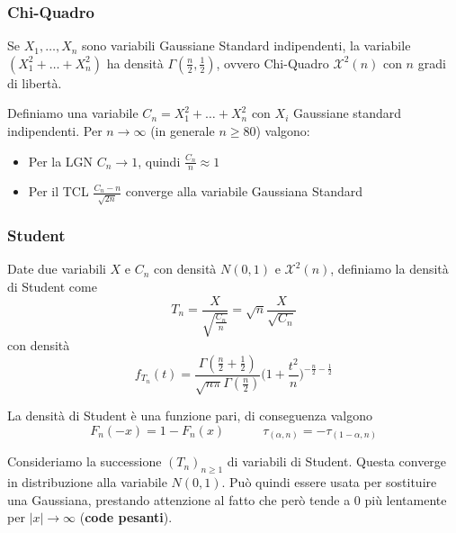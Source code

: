 \subsubsection{Chi-Quadro}
\begin{definition}
	Se $X_1, \ldots, X_n$ sono variabili Gaussiane Standard indipendenti, la variabile $(X_1^2 + \ldots + X_n^2)$ ha densità $\Gamma(\frac{n}{2}, \frac{1}{2})$, ovvero Chi-Quadro $\mathcal{X}^2(n)$ con $n$ gradi di libertà.
\end{definition}

\begin{proposition}[Approssimazioni]
	Definiamo una variabile $C_n = X_1^2 + \ldots + X_n^2$ con $X_i$ Gaussiane standard indipendenti. Per $n\to \infty$ (in generale $n \geq 80$) valgono:
	\begin{itemize}
		\item Per la LGN $C_n \to 1$, quindi $\frac{C_n}{n} \approx 1$
		\item Per il TCL $\frac{C_n -n}{\sqrt{2n}}$ converge alla variabile Gaussiana Standard
	\end{itemize}
\end{proposition}
\subsubsection{Student}
\begin{definition}
	Date due variabili $X$ e $C_n$ con densità $N(0,1)$ e $\mathcal{X}^2(n)$, definiamo la densità di Student come
	\begin{equation}
		T_n = \frac{X}{\sqrt{\frac{C_n}{n}}} = \sqrt{n} \frac{X}{\sqrt{C_n}}
	\end{equation}
	con densità
	\begin{equation}
		f_{T_n}(t) = \frac{\Gamma(\frac{n}{2}+\frac{1}{2})}{\sqrt{n\pi}\Gamma(\frac{n}{2})}\bigg(1+\frac{t^2}{n}\bigg)^{-\frac{n}{2}-\frac{1}{2}}
	\end{equation}
\end{definition}

\begin{proposition}
	La densità di Student è una funzione pari, di conseguenza valgono
	\begin{equation}
		F_n(-x)=1-F_n(x) \quad\quad\quad \tau_{(\alpha, n)} = -\tau_{(1-\alpha, n)}
	\end{equation}
\end{proposition}

\begin{theorem}
	Consideriamo la successione $(T_n)_{n\geq 1}$ di variabili di Student. Questa converge in distribuzione alla variabile $N(0,1)$. Può quindi essere usata per sostituire una Gaussiana, prestando attenzione al fatto che però tende a $0$ più lentamente per $\lvert x \rvert \to \infty$ (\textbf{code pesanti}).
\end{theorem}

